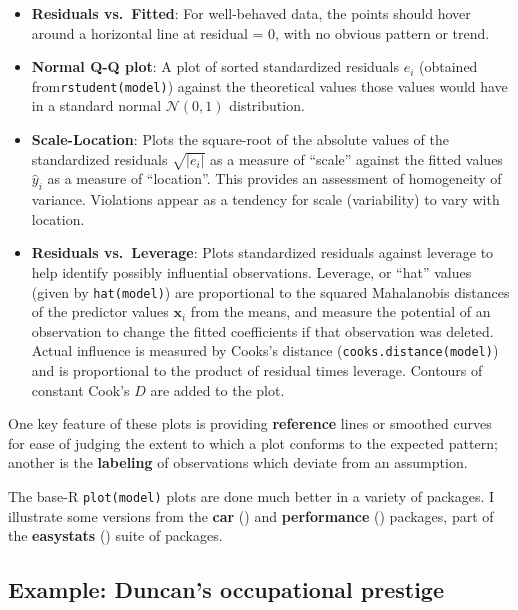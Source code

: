 \documentclass[
  letterpaper,
  10pt,
  krantz2]{krantz}
\begin{document}
\begin{itemize}
\item
  \textbf{Residuals vs.~Fitted}: For well-behaved data, the points
  should hover around a horizontal line at residual = 0, with no obvious
  pattern or trend.
\item
  \textbf{Normal Q-Q plot}: A plot of sorted standardized residuals
  \(e_i\) (obtained from\texttt{rstudent(model)}) against the
  theoretical values those values would have in a standard normal
  \(\mathcal{N}(0, 1)\) distribution.
\item
  \textbf{Scale-Location}: Plots the square-root of the absolute values
  of the standardized residuals \(\sqrt{| e_i |}\) as a measure of
  ``scale'' against the fitted values \(\hat{y}_i\) as a measure of
  ``location''. This provides an assessment of homogeneity of variance.
  Violations appear as a tendency for scale (variability) to vary with
  location.
\item
  \textbf{Residuals vs.~Leverage}: Plots standardized residuals against
  leverage to help identify possibly influential observations. Leverage,
  or ``hat'' values (given by \texttt{hat(model)}) are proportional to
  the squared Mahalanobis distances of the predictor values
  \(\mathbf{x}_i\) from the means, and measure the potential of an
  observation to change the fitted coefficients if that observation was
  deleted. Actual influence is measured by Cooks's distance
  (\texttt{cooks.distance(model)}) and is proportional to the product of
  residual times leverage. Contours of constant Cook's \(D\) are added
  to the plot.
\end{itemize}

One key feature of these plots is providing \textbf{reference} lines or
smoothed curves for ease of judging the extent to which a plot conforms
to the expected pattern; another is the \textbf{labeling} of
observations which deviate from an assumption.

The base-R \texttt{plot(model)} plots are done much better in a variety
of packages. I illustrate some versions from the \textbf{car}
() and \textbf{performance}
()
packages, part of the \textbf{easystats}
() suite of packages.

\subsection{Example: Duncan's occupational
prestige}\label{sec-example-duncan}
\end{document}
